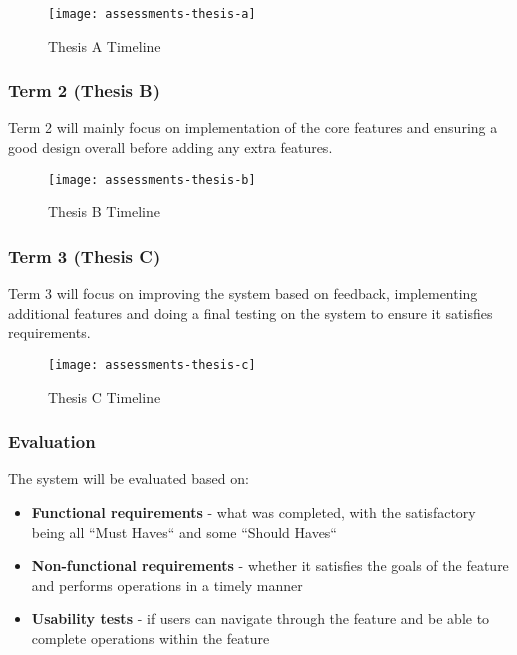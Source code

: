 \begin{figure}[h!]
	\centering
	\texttt{[image: assessments-thesis-a]}
	\caption{Thesis A Timeline}
\end{figure}

\subsubsection{Term 2 (Thesis B)}
Term 2 will mainly focus on implementation of the core features and ensuring a good design overall before adding any extra features.\\

\begin{figure}[h!]
	\centering
	\texttt{[image: assessments-thesis-b]}
	\caption{Thesis B Timeline}
\end{figure}

\subsubsection{Term 3 (Thesis C)}
Term 3 will focus on improving the system based on feedback, implementing additional features and doing a final testing on the system to ensure it satisfies requirements.\\

\begin{figure}[h!]
	\centering
	\texttt{[image: assessments-thesis-c]}
	\caption{Thesis C Timeline}
\end{figure}


\subsubsection{Evaluation}
The system will be evaluated based on:
\begin{itemize}
	\item \textbf{Functional requirements} - what was completed, with the satisfactory being all ``Must Haves`` and some ``Should Haves``
	\item \textbf{Non-functional requirements} - whether it satisfies the goals of the feature and performs operations in a timely manner
	\item \textbf{Usability tests} - if users can navigate through the feature and be able to complete operations within the feature
\end{itemize}


\newpage